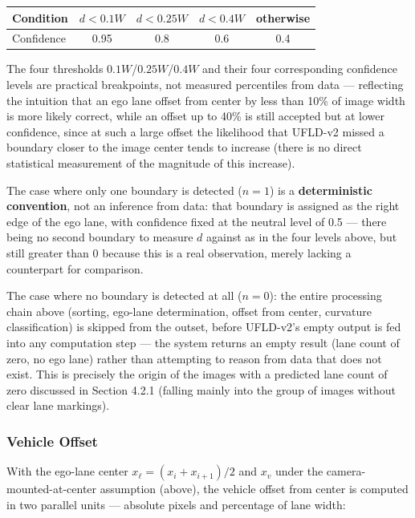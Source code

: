 \documentclass[12pt,a4paper]{report}
\begin{document}
\begin{center}
    \small
    \begin{tabular}{@{}lcccc@{}}
        \toprule
        Condition   & $d < 0.1W$ & $d < 0.25W$ & $d < 0.4W$ & otherwise \\
        \midrule
        Confidence  & 0.95       & 0.8         & 0.6        & 0.4 \\
        \bottomrule
    \end{tabular}
\end{center}

The four thresholds $0.1W$/$0.25W$/$0.4W$ and their four corresponding confidence levels are practical breakpoints, not measured percentiles from data --- reflecting the intuition that an ego lane offset from center by less than 10\% of image width is more likely correct, while an offset up to 40\% is still accepted but at lower confidence, since at such a large offset the likelihood that UFLD-v2 missed a boundary closer to the image center tends to increase (there is no direct statistical measurement of the magnitude of this increase).

The case where only one boundary is detected ($n=1$) is a \textbf{deterministic convention}, not an inference from data: that boundary is assigned as the right edge of the ego lane, with confidence fixed at the neutral level of 0.5 --- there being no second boundary to measure $d$ against as in the four levels above, but still greater than 0 because this is a real observation, merely lacking a counterpart for comparison.

The case where no boundary is detected at all ($n=0$): the entire processing chain above (sorting, ego-lane determination, offset from center, curvature classification) is skipped from the outset, before UFLD-v2's empty output is fed into any computation step --- the system returns an empty result (lane count of zero, no ego lane) rather than attempting to reason from data that does not exist. This is precisely the origin of the images with a predicted lane count of zero discussed in Section 4.2.1 (falling mainly into the group of images without clear lane markings).

\subsubsection*{Vehicle Offset}

With the ego-lane center $x_{\ell} = (x_i + x_{i+1})/2$ and $x_v$ under the camera-mounted-at-center assumption (above), the vehicle offset from center is computed in two parallel units --- absolute pixels and percentage of lane width:
\end{document}
